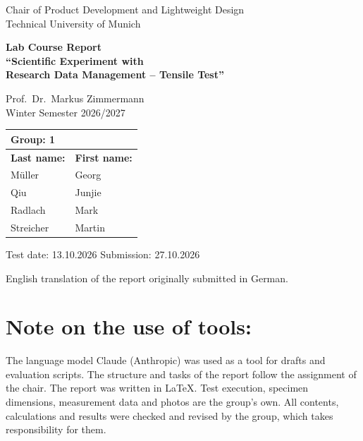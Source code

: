 \documentclass[11pt,a4paper]{article}
\begin{document}
\begin{titlepage}
\centering
{\large Chair of Product Development and Lightweight Design\\
Technical University of Munich\par}
\vspace{2.5cm}
{\LARGE\bfseries Lab Course Report\\[0.3em]
``Scientific Experiment with\\ Research Data Management -- Tensile Test''\par}
\vspace{1cm}
{\large Prof.~Dr.~Markus Zimmermann\\ Winter Semester 2026/2027\par}
\vspace{2.5cm}
\begin{tabular}{|p{6cm}|p{6cm}|}
\hline
\multicolumn{2}{|l|}{\textbf{Group:} 1}\\ \hline
\textbf{Last name:} & \textbf{First name:}\\ \hline
Müller    & Georg   \\ \hline
Qiu       & Junjie  \\ \hline
Radlach   & Mark    \\ \hline
Streicher & Martin  \\ \hline
\end{tabular}
\vfill
{\large Test date: 13.10.2026 \qquad Submission: 27.10.2026\par}
\vspace{0.4cm}
{\small English translation of the report originally submitted in German.\par}
\end{titlepage}

\tableofcontents

\vspace{\baselineskip}

\section*{\small Note on the use of tools:}
{\small The language model Claude (Anthropic) was used as a tool for drafts and evaluation scripts. The structure and tasks of the report follow the assignment of the chair. The report was written in LaTeX. Test execution, specimen dimensions, measurement data and photos are the group's own. All contents, calculations and results were checked and revised by the group, which takes responsibility for them.\par}
\end{document}
